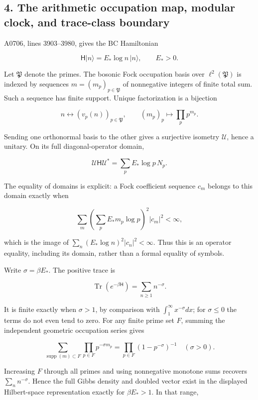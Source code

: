 \subsection{4. The arithmetic occupation map, modular clock, and
trace-class
boundary}\label{TranscriptStage:proof10:the-arithmetic-occupation-map-modular-clock-and-trace-class-boundary}

A0706, lines 3903--3980, gives the BC Hamiltonian

\[
\mathsf H|n\rangle=E_*\log n\,|n\rangle,
\qquad E_*>0.
\]

Let \(\mathfrak P\) denote the primes. The bosonic Fock occupation basis
over \(\ell^2(\mathfrak P)\) is indexed by sequences
\(m=(m_p)_{p\in\mathfrak P}\) of nonnegative integers of finite total
sum. Such a sequence has finite support. Unique factorization is a
bijection

\[
n\longleftrightarrow(v_p(n))_{p\in\mathfrak P},
\qquad (m_p)_p\longmapsto\prod_pp^{m_p}.
\]

Sending one orthonormal basis to the other gives a surjective isometry
\(\mathcal U\), hence a unitary. On its full diagonal-operator domain,

\[
\mathcal U\mathsf H\mathcal U^*=\sum_pE_*\log p\,N_p.
\]

The equality of domains is explicit: a Fock coefficient sequence \(c_m\)
belongs to this domain exactly when

\[
\sum_m\left(\sum_pE_*m_p\log p\right)^2|c_m|^2<\infty,
\]

which is the image of \(\sum_n(E_*\log n)^2|c_n|^2<\infty\). Thus this
is an operator equality, including its domain, rather than a formal
equality of symbols.

Write \(\sigma=\beta E_*\). The positive trace is

\[
\operatorname{Tr}(e^{-\beta\mathsf H})=\sum_{n\ge1}n^{-\sigma}.
\]

It is finite exactly when \(\sigma>1\), by comparison with
\(\int_1^\infty x^{-\sigma}dx\); for \(\sigma\le0\) the terms do not
even tend to zero. For any finite prime set \(F\), summing the
independent geometric occupation series gives

\[
\sum_{\operatorname{supp}(m)\subset F}\prod_{p\in F}p^{-\sigma m_p}
=\prod_{p\in F}(1-p^{-\sigma})^{-1}\quad(\sigma>0).
\]

Increasing \(F\) through all primes and using nonnegative monotone sums
recovers \(\sum_n n^{-\sigma}\). Hence the full Gibbs density and
doubled vector exist in the displayed Hilbert-space representation
exactly for \(\beta E_*>1\). In that range,

